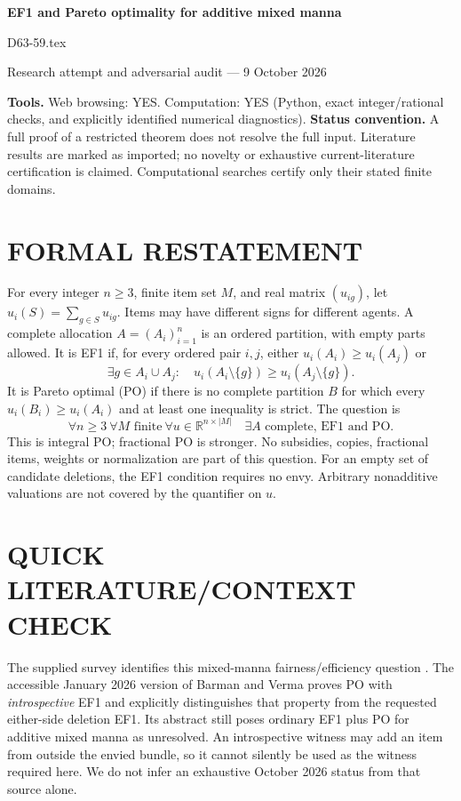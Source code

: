 \documentclass[11pt,a4paper]{article}
\theoremstyle{remark}\newtheorem{remark}[theorem]{Remark}
\newcommand{\R}{\mathbb R}
\begin{document}
\begin{center}
{\LARGE\bfseries EF1 and Pareto optimality for additive mixed manna}\par\medskip
{\large D63-59.tex}\par
Research attempt and adversarial audit --- 9 October 2026
\end{center}
\label{problem:OP-0190}
\label{game:GT-060}
\textbf{Tools.} Web browsing: YES. Computation: YES (Python, exact integer/rational checks, and explicitly identified numerical diagnostics).
\textbf{Status convention.} A full proof of a restricted theorem does not resolve the full input. Literature results are marked as imported; no novelty or exhaustive current-literature certification is claimed. Computational searches certify only their stated finite domains.

\section{FORMAL RESTATEMENT}
For every integer $n\ge3$, finite item set $M$, and real matrix $(u_{ig})$, let $u_i(S)=\sum_{g\in S}u_{ig}$. Items may have different signs for different agents. A complete allocation $A=(A_i)_{i=1}^n$ is an ordered partition, with empty parts allowed. It is EF1 if, for every ordered pair $i,j$, either $u_i(A_i)\ge u_i(A_j)$ or
\[
\exists g\in A_i\cup A_j:\quad u_i(A_i\setminus\{g\})\ge u_i(A_j\setminus\{g\}).
\]
It is Pareto optimal (PO) if there is no complete partition $B$ for which every $u_i(B_i)\ge u_i(A_i)$ and at least one inequality is strict. The question is
\[
\forall n\ge3\ \forall M\text{ finite}\ \forall u\in\R^{n\times |M|}\quad
\exists A\text{ complete, EF1 and PO}.
\]
This is integral PO; fractional PO is stronger. No subsidies, copies, fractional items, weights or normalization are part of this question. For an empty set of candidate deletions, the EF1 condition requires no envy. Arbitrary nonadditive valuations are not covered by the quantifier on $u$.

\section{QUICK LITERATURE/CONTEXT CHECK}
The supplied survey identifies this mixed-manna fairness/efficiency question \cite{survey}. The accessible January 2026 version of Barman and Verma \cite{bv} proves PO with \emph{introspective} EF1 and explicitly distinguishes that property from the requested either-side deletion EF1. Its abstract still poses ordinary EF1 plus PO for additive mixed manna as unresolved. An introspective witness may add an item from outside the envied bundle, so it cannot silently be used as the witness required here. We do not infer an exhaustive October 2026 status from that source alone.
\end{document}
